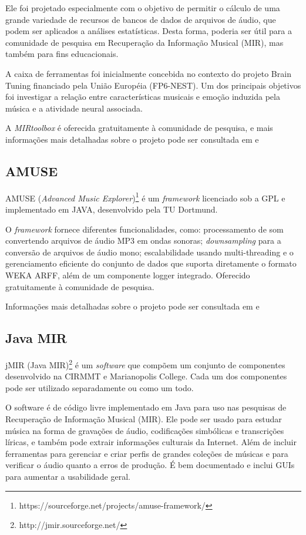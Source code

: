 Ele foi projetado especialmente com o objetivo de permitir o cálculo de uma grande variedade de recursos de bancos de dados de arquivos de áudio, que podem ser aplicados a análises estatísticas. Desta forma, poderia ser útil para a comunidade de pesquisa em Recuperação da Informação Musical (MIR), mas também para fins educacionais.

A caixa de ferramentas foi inicialmente concebida no contexto do projeto Brain Tuning financiado pela União Européia (FP6-NEST). Um dos principais objetivos foi investigar a relação entre características musicais e emoção induzida pela música e a atividade neural associada.

A \textit{MIRtoolbox} é oferecida gratuitamente à comunidade de pesquisa, e mais informações mais detalhadas sobre o projeto pode ser consultada em \cite{lartillot2007} e \cite{mirtoolbox}

\subsection{AMUSE}
AMUSE (\textit{Advanced Music Explorer})\footnote{https://sourceforge.net/projects/amuse-framework/} é um \textit{framework} licenciado sob a GPL e implementado em JAVA, desenvolvido pela TU Dortmund.

O \textit{framework} fornece diferentes funcionalidades, como: processamento de som convertendo arquivos de áudio MP3 em ondas sonoras; \textit{downsampling} para a conversão de arquivos de áudio mono; escalabilidade usando multi-threading e o gerenciamento eficiente do conjunto de dados que suporta diretamente o formato WEKA ARFF, além de um componente logger integrado. Oferecido gratuitamente à comunidade de pesquisa.

Informações mais detalhadas sobre o projeto pode ser consultada em \cite{vatolkin2010} e \cite{amuse}

\subsection{Java MIR}
jMIR (Java MIR)\footnote{http://jmir.sourceforge.net/} é um \textit{software} que compõem um conjunto de componentes desenvolvido na CIRMMT e Marianopolis College. Cada um dos componentes pode ser utilizado separadamente ou como um todo.

O software é de código livre implementado em Java para uso nas pesquisas de Recuperação de Informação Musical (MIR). Ele pode ser usado para estudar música na forma de gravações de áudio, codificações simbólicas e transcrições líricas, e também pode extrair informações culturais da Internet. Além de incluir ferramentas para gerenciar e criar perfis de grandes coleções de músicas e para verificar o áudio quanto a erros de produção. É bem documentado e inclui GUIs para aumentar a usabilidade geral.

